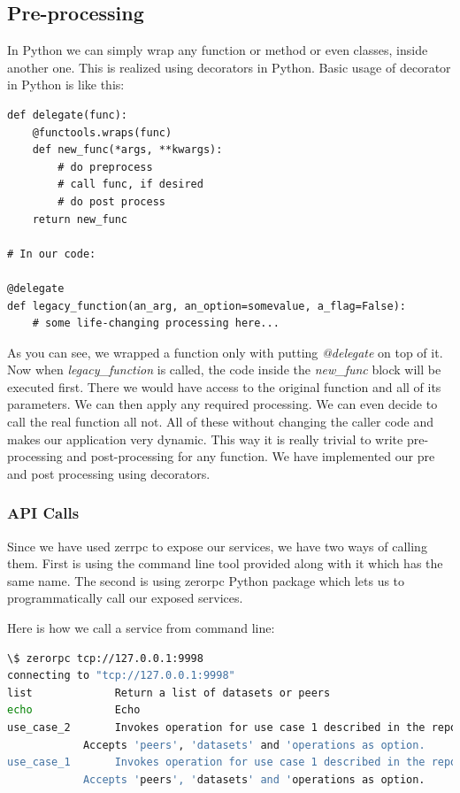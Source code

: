 \subsection{Pre-processing}
In Python we can simply wrap any function or method or even classes, inside another one.
This is realized using decorators in Python. 
Basic usage of decorator in Python is like this:

\begin{lstlisting}[caption={Pre-processing with decorators in Python}]
def delegate(func):
    @functools.wraps(func)
    def new_func(*args, **kwargs):
        # do preprocess
        # call func, if desired
        # do post process
    return new_func

# In our code:

@delegate
def legacy_function(an_arg, an_option=somevalue, a_flag=False):
    # some life-changing processing here...

\end{lstlisting}

As you can see, we wrapped a function only with putting \textit{@delegate} on top of it.
Now when \textit{legacy\_function} is called, the code inside the \textit{new\_func} block
will be executed first. 
There we would have access to the original function and all of its parameters. 
We can then apply any required processing. 
We can even decide to call the real function all not.
All of these without changing the caller code and makes our application very dynamic.
This way it is really trivial to write pre-processing and post-processing for any function.
We have implemented our pre and post processing using decorators.

\subsubsection{API Calls}
Since we have used zerrpc to expose our services, we have two ways of calling them.
First is using the command line tool provided along with it which has the same name.
The second is using zerorpc Python package which lets us to programmatically call
our exposed services.

Here is how we call a service from command line:

\begin{lstlisting}[language=sh, caption={Quering an API endpoint for available commands}]
\$ zerorpc tcp://127.0.0.1:9998
connecting to "tcp://127.0.0.1:9998"
list             Return a list of datasets or peers
echo             Echo
use_case_2       Invokes operation for use case 1 described in the report.
		    Accepts 'peers', 'datasets' and 'operations as option.
use_case_1       Invokes operation for use case 1 described in the report. 
		    Accepts 'peers', 'datasets' and 'operations as option.
\end{lstlisting}

